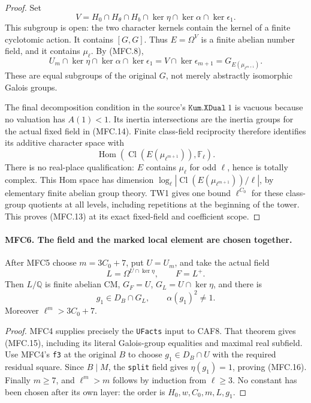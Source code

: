 \begin{proof}
Set
\[
 V=H_0\cap H_\theta\cap H_b\cap\ker\eta\cap\ker\alpha
                                      \cap\ker\epsilon_1.
\]
This subgroup is open: the two character kernels contain the
kernel of a finite cyclotomic action.  It contains \([G,G]\).
Thus \(E=\Omega^V\) is a finite abelian number field, and it
contains \(\mu_\ell\).  By (MFC.8),
\[
 U_m\cap\ker\eta\cap\ker\alpha\cap\ker\epsilon_1
                 =V\cap\ker\epsilon_{m+1}
                 =G_{E(\mu_{\ell^{m+1}})}.                \tag{MFC.14}
\]
These are equal subgroups of the original \(G\), not merely
abstractly isomorphic Galois groups.

The final decomposition condition in the source's
\(\texttt{Kum.XDual}\ 1\) is vacuous because no valuation
has \(A(1)<1\).  Its inertia intersections are the inertia
groups for the actual fixed field in (MFC.14).  Finite class-field
reciprocity therefore identifies its additive character space with
\[
 \operatorname{Hom}(\operatorname{Cl}(E(\mu_{\ell^{m+1}})),
                    \mathbb F_\ell).
\]
There is no real-place qualification: \(E\) contains
\(\mu_\ell\) for odd \(\ell\), hence is totally complex.
This Hom space has dimension
\(\log_\ell|\operatorname{Cl}(E(\mu_{\ell^{m+1}}))/\ell|\),
by elementary finite abelian group theory.  TW1 gives one bound
\(\ell^{C_0}\) for these class-group quotients at all levels,
including repetitions at the beginning of the tower.  This proves
(MFC.13) at its exact fixed-field and coefficient scope.
\end{proof}

\paragraph{MFC6. The field and the marked local element are chosen together.}
\label{claim:MFC6}
After MFC5 choose \(m=3C_0+7\), put \(U=U_m\), and take
the actual field
\[
                  L=\Omega^{U\cap\ker\eta},\qquad F=L^+.
                                                               \tag{MFC.15}
\]
Then \(L/\mathbb Q\) is finite abelian CM,
\(G_F=U\), \(G_L=U\cap\ker\eta\), and there is
\[
              g_1\in D_B\cap G_L,\qquad\alpha(g_1)^2\ne1.
                                                               \tag{MFC.16}
\]
Moreover \(\ell^m>3C_0+7\).

\begin{proof}
MFC4 supplies precisely the \texttt{UFacts} input to CAF8.
That theorem gives (MFC.15), including its literal Galois-group
equalities and maximal real subfield.  Use MFC4's \texttt{f3}
at the original \(B\) to choose \(g_1\in D_B\cap U\) with
the required residual square.  Since \(B\mid M\), the
\texttt{split} field gives \(\eta(g_1)=1\), proving (MFC.16).
Finally \(m\ge7\), and \(\ell^m>m\) follows by induction
from \(\ell\ge3\).  No constant has been chosen after its
own layer: the order is \(H_0,w,C_0,m,L,g_1\).
\end{proof}


